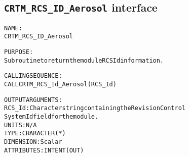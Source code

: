 \subsection{\texttt{CRTM\_RCS\_ID\_Aerosol} interface}
  \label{sec:CRTM_RCS_ID_Aerosol_interface}
  \begin{alltt}
 
  NAME:
        CRTM_RCS_ID_Aerosol
 
  PURPOSE:
        Subroutine to return the module RCS Id information.
 
  CALLING SEQUENCE:
        CALL CRTM_RCS_Id_Aerosol( RCS_Id )
 
  OUTPUT ARGUMENTS:
        RCS_Id:        Character string containing the Revision Control
                       System Id field for the module.
                       UNITS:      N/A
                       TYPE:       CHARACTER(*)
                       DIMENSION:  Scalar
                       ATTRIBUTES: INTENT(OUT)
 
  \end{alltt}
